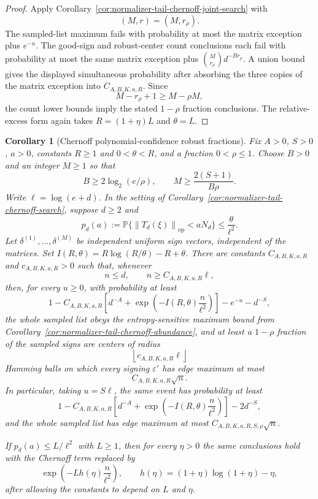 \documentclass[11pt]{amsart}
\numberwithin{equation}{section}
\newtheorem{corollary}[theorem]{Corollary}
\theoremstyle{definition}
\theoremstyle{remark}
\newcommand{\op}{\mathrm{op}}
\newcommand{\Prob}{\mathbb P}
\newcommand{\norm}[1]{\left\lVert #1\right\rVert}
\newcommand{\eps}{\varepsilon}
\begin{document}
\begin{proof}
Apply Corollary~\ref{cor:normalizer-tail-chernoff-joint-search} with
\[
  (M,r)=(M,r_\rho).
\]
The sampled-list maximum fails with probability at most the matrix exception
plus \(e^{-u}\).  The good-sign and robust-center count conclusions each fail
with probability at most the same matrix exception plus
\(\binom{M}{r_\rho}d^{-B r_\rho}\).  A union bound gives the displayed
simultaneous probability after absorbing the three copies of the matrix
exception into \(C_{A,B,K,a,R}\).  Since
\[
  M-r_\rho+1\ge M-\rho M,
\]
the count lower bounds imply the stated \(1-\rho\) fraction conclusions.  The
relative-excess form again takes \(R=(1+\eta)L\) and \(\theta=L\).
\end{proof}

\begin{corollary}[Chernoff polynomial-confidence robust fractions]
\label{cor:normalizer-tail-chernoff-robust-fraction-confidence}
Fix \(A>0\), \(S>0\), \(a>0\), constants \(R\ge1\) and \(0<\theta<R\), and a
fraction \(0<\rho\le1\).  Choose \(B>0\) and an integer \(M\ge1\) so that
\[
  B\ge 2\log_2(e/\rho),
  \qquad
  M\ge \frac{2(S+1)}{B\rho}.
\]
Write \(\ell=\log(e+d)\).  In the setting of
Corollary~\ref{cor:normalizer-tail-chernoff-search}, suppose \(d\ge2\) and
\[
  p_d(a):=\Prob\{\norm{T_d(\xi)}_{\op}<aN_d\}\le \frac{\theta}{\ell^2}.
\]
Let \(\delta^{(1)},\ldots,\delta^{(M)}\) be independent uniform sign vectors,
independent of the matrices.  Set \(I(R,\theta)=R\log(R/\theta)-R+\theta\).
There are constants \(C_{A,B,K,a,R}\) and \(c_{A,B,K,a,R}>0\) such that,
whenever
\[
  n\le d,\qquad n\ge C_{A,B,K,a,R}\ell ,
\]
then, for every \(u\ge0\), with probability at least
\[
  1-
  C_{A,B,K,a,R}\left[
    d^{-A}+\exp\left(-I(R,\theta)\frac n{\ell^2}\right)\right]
  -e^{-u}-d^{-S},
\]
the whole sampled list obeys the entropy-sensitive maximum bound from
Corollary~\ref{cor:normalizer-tail-chernoff-abundance}, and at least a
\(1-\rho\) fraction of the sampled signs are centers of radius
\[
  \left\lfloor c_{A,B,K,a,R}\ell\right\rfloor
\]
Hamming balls on which every signing \(\eps'\) has edge maximum at most
\[
  C_{A,B,K,a,R}\sqrt n .
\]
In particular, taking \(u=S\ell\), the same event has probability at least
\[
  1-
  C_{A,B,K,a,R}\left[
    d^{-A}+\exp\left(-I(R,\theta)\frac n{\ell^2}\right)\right]
  -2d^{-S},
\]
and the whole sampled list has edge maximum at most
\(C_{A,B,K,a,R,S,\rho}\sqrt n\).

If \(p_d(a)\le L/\ell^2\) with \(L\ge1\), then for every \(\eta>0\) the same
conclusions hold with the Chernoff term replaced by
\[
  \exp\left(-Lh(\eta)\frac n{\ell^2}\right),
  \qquad h(\eta)=(1+\eta)\log(1+\eta)-\eta ,
\]
after allowing the constants to depend on \(L\) and \(\eta\).
\end{corollary}
\end{document}
